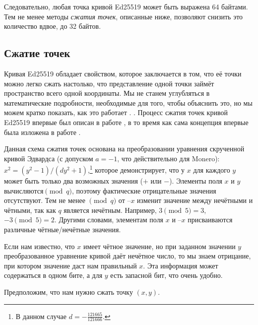 Следовательно, любая точка кривой Ed25519 может быть выражена 64 байтами. Тем не менее методы {\em сжатия точек}, описанные ниже, позволяют снизить это количество вдвое, до 32 байтов.


\subsection{Сжатие точек}
\label{point_compression_section}

Кривая Ed25519 обладает свойством, которое заключается в том, что её точки можно легко сжать настолько, что представление одной точки займёт пространство всего одной координа\-ты. Мы не станем углубляться в математические подробности, необходимые для того, чтобы объяснить это, но мы можем кратко показать, как это работает \cite{eddsa-ed25519-irtf}. . Процесс сжатия точек кривой Ed25519 впервые был описан в работе \cite{Bernstein2012}, в то время как сама концепция впервые была изложена в работе \cite{Miller:point-compression-origin}.

Данная схема сжатия точек основана на преобразовании уравнения скрученной кривой Эд\-вардса (с допуском $a = -1$, что действительно для Monero): $x^2 = (y^2-1)/(d y^2+1)$,\footnote{В данном случае $d = - \frac{121665}{121666}$.} которое демонстрирует, что у $x$ для каждого $y$ может быть только два возможных значения ($+$ или $-$). Элементы поля $x$ и $y$ вычисляются$\pmod{q}$, поэтому фактические отрицательные значения отсутствуют. Тем не менее $\pmod{q}$ от $–x$ изменит значение между нечётными и чётными, так как $q$ является нечётным. Например, $3 \pmod{5} = 3$, $-3 \pmod{5} = 2$. Другими словами, элементам поля $x$ и $–x$ присваиваются различные чётные/нечётные значения.

Если нам известно, что $x$ имеет чётное значение, но при заданном значении $y$ преобразованное уравнение кривой даёт нечётное число, то мы знаем отрицание, при котором значение даст нам правильный $x$. Эта информация может содержаться в одном бите, а для $y$ есть запасной бит, что очень удобно.

Предположим, что нам нужно сжать точку \((x, y)\).

